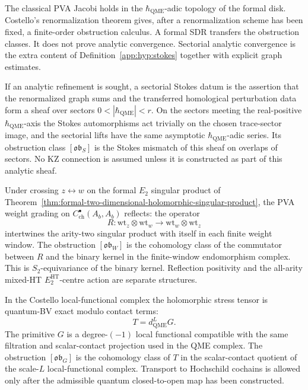 \begin{rmk}\label{app:rmk:why-analytic}
The classical PVA Jacobi holds in the $\hbar_{\mathrm{QME}}$-adic topology of the
formal disk.  Costello's renormalization theorem gives, after a
renormalization scheme has been fixed, a finite-order obstruction
calculus.  A formal SDR transfers the obstruction classes.  It does not
prove analytic convergence.  Sectorial analytic convergence is the extra
content of Definition~\ref{app:hyp:stokes} together with explicit graph
estimates.
\end{rmk}

\begin{defn}\label{app:hyp:stokes}
If an analytic refinement is sought, a sectorial Stokes datum is the
assertion that the renormalized graph sums and the
transferred homological perturbation data form a sheaf over sectors
\(0<|\hbar_{\mathrm{QME}}|<r\).  On the sectors meeting the real-positive
\(\hbar_{\mathrm{QME}}\)-axis the Stokes automorphisms act trivially on the chosen
trace-sector image, and the sectorial lifts have the same asymptotic
\(\hbar_{\mathrm{QME}}\)-adic series.  Its obstruction class
\([\mathfrak{ob}_S]\) is the Stokes mismatch of this sheaf on overlaps
of sectors.  No KZ connection is assumed unless it is constructed as
part of this analytic sheaf.
\end{defn}

\begin{defn}\label{app:hyp:reflected-weights}
Under crossing \(z\leftrightarrow w\) on the formal \(E_2\) singular product of
Theorem~\ref{thm:formal-two-dimensional-holomorphic-singular-product}, the PVA
weight grading on $C^\bullet_{\mathrm{ch}}(A_b,A_b)$ reflects: the
operator
\[
  R\colon\mathrm{wt}_z\otimes\mathrm{wt}_w
   \longrightarrow\mathrm{wt}_w\otimes\mathrm{wt}_z
\]
intertwines the arity-two singular product with itself in each finite
weight window.  The obstruction \([\mathfrak{ob}_W]\) is the cohomology
class of the commutator between \(R\) and the binary kernel in the
finite-window endomorphism complex.  This is \(S_2\)-equivariance of the
binary kernel.  Reflection positivity and the all-arity mixed-HT
\(E_2^{\mathrm{HT}}\)-centre action are separate structures.
\end{defn}

\begin{defn}\label{app:hyp:T-Q-G}
In the Costello local-functional complex the holomorphic stress tensor is
quantum-BV exact modulo contact terms:
\[
  T=d_{\mathrm{QME}}^{L}G .
\]
The primitive \(G\) is a degree-\((-1)\) local functional compatible with
the same filtration and scalar-contact projection used in the QME
complex.  The obstruction \([\mathfrak{ob}_G]\) is the cohomology class
of \(T\) in the scalar-contact quotient of the scale-\(L\)
local-functional complex.  Transport to Hochschild cochains is allowed
only after the admissible quantum closed-to-open map has been
constructed.
\end{defn}

